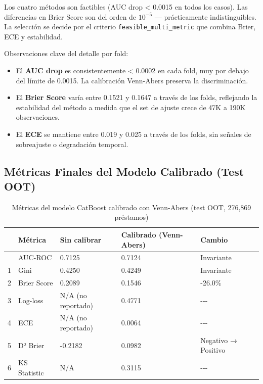 \documentclass[
  spanish,
  11pt,
  letterpaper,
]{scrbook}
\providecommand{\tightlist}{%
  \setlength{\itemsep}{0pt}\setlength{\parskip}{0pt}}
\theoremstyle{plain}
\theoremstyle{remark}
\begin{document}
Los cuatro métodos son factibles (AUC drop \textless{} 0.0015 en todos
los casos). Las diferencias en Brier Score son del orden de \(10^{-5}\)
--- prácticamente indistinguibles. La selección se decide por el
criterio \texttt{feasible\_multi\_metric} que combina Brier, ECE y
estabilidad.

Observaciones clave del detalle por fold:

\begin{itemize}
\tightlist
\item
  El \textbf{AUC drop} es consistentemente \textless{} 0.0002 en cada
  fold, muy por debajo del límite de 0.0015. La calibración Venn-Abers
  preserva la discriminación.
\item
  El \textbf{Brier Score} varía entre 0.1521 y 0.1647 a través de los
  folds, reflejando la estabilidad del método a medida que el set de
  ajuste crece de 47K a 190K observaciones.
\item
  El \textbf{ECE} se mantiene entre 0.019 y 0.025 a través de los folds,
  sin señales de sobreajuste o degradación temporal.
\end{itemize}

\subsection{Métricas Finales del Modelo Calibrado (Test
OOT)}\label{sec-calibrated-metrics}

{

\begin{longtable}[]{@{}lllll@{}}

\caption{\label{tbl-final-calibrated-metrics}Métricas del modelo
CatBoost calibrado con Venn-Abers (test OOT, 276,869 préstamos)}

\tabularnewline

\toprule\noalign{}
& Métrica & Sin calibrar & Calibrado (Venn-Abers) & Cambio \\
\midrule\noalign{}
\endhead
\bottomrule\noalign{}
\endlastfoot
0 & AUC-ROC & 0.7125 & 0.7124 & Invariante \\
1 & Gini & 0.4250 & 0.4249 & Invariante \\
2 & Brier Score & 0.2089 & 0.1546 & -26.0\% \\
3 & Log-loss & N/A (no reportado) & 0.4771 & -\/-\/- \\
4 & ECE & N/A (no reportado) & 0.0064 & -\/-\/- \\
5 & D² Brier & -0.2182 & 0.0982 & Negativo → Positivo \\
6 & KS Statistic & N/A & 0.3115 & -\/-\/- \\

\end{longtable}

}
\end{document}
